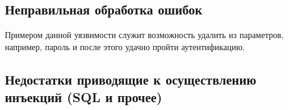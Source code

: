 \documentclass[11pt, a4paper]{article}		%
\begin{document}

\subsection{Неправильная обработка ошибок}

Примером данной уязвимости служит возможность удалить из параметров, например, пароль и после этого удачно пройти аутентификацию.



\subsection{Недостатки приводящие к осуществлению инъекций (SQL и прочее)}
\end{document}
